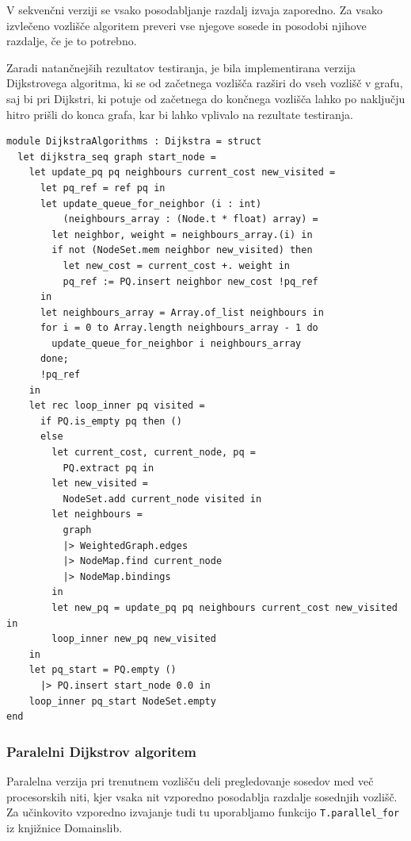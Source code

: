 \documentclass[fin1, tisk]{fmfdelo}
\begin{document}
V sekvenčni verziji se vsako posodabljanje razdalj izvaja zaporedno. Za vsako izvlečeno vozlišče algoritem preveri vse njegove
sosede in posodobi njihove razdalje, če je to potrebno.

Zaradi natančnejših rezultatov testiranja, je bila implementirana verzija Dijkstrovega algoritma, ki se od začetnega vozlišča
razširi do vseh vozlišč v grafu, saj bi pri Dijkstri, ki potuje od začetnega do končnega vozlišča lahko po naključju
hitro prišli do konca grafa, kar bi lahko vplivalo na rezultate testiranja.

\begin{lstlisting}
module DijkstraAlgorithms : Dijkstra = struct
  let dijkstra_seq graph start_node =
    let update_pq pq neighbours current_cost new_visited =
      let pq_ref = ref pq in
      let update_queue_for_neighbor (i : int)
          (neighbours_array : (Node.t * float) array) =
        let neighbor, weight = neighbours_array.(i) in
        if not (NodeSet.mem neighbor new_visited) then
          let new_cost = current_cost +. weight in
          pq_ref := PQ.insert neighbor new_cost !pq_ref
      in
      let neighbours_array = Array.of_list neighbours in
      for i = 0 to Array.length neighbours_array - 1 do
        update_queue_for_neighbor i neighbours_array
      done;
      !pq_ref
    in
    let rec loop_inner pq visited =
      if PQ.is_empty pq then ()
      else
        let current_cost, current_node, pq =
          PQ.extract pq in
        let new_visited = 
          NodeSet.add current_node visited in
        let neighbours =
          graph
          |> WeightedGraph.edges
          |> NodeMap.find current_node
          |> NodeMap.bindings
        in
        let new_pq = update_pq pq neighbours current_cost new_visited in
        loop_inner new_pq new_visited
    in
    let pq_start = PQ.empty () 
      |> PQ.insert start_node 0.0 in
    loop_inner pq_start NodeSet.empty
end
\end{lstlisting}

\subsubsection{Paralelni Dijkstrov algoritem}

Paralelna verzija pri trenutnem vozlišču deli pregledovanje sosedov med več procesorskih niti, kjer vsaka nit vzporedno posodablja
razdalje sosednjih vozlišč. Za učinkovito vzporedno izvajanje tudi tu uporabljamo funkcijo \texttt{T.parallel\_for} iz knjižnice Domainslib.
\end{document}
